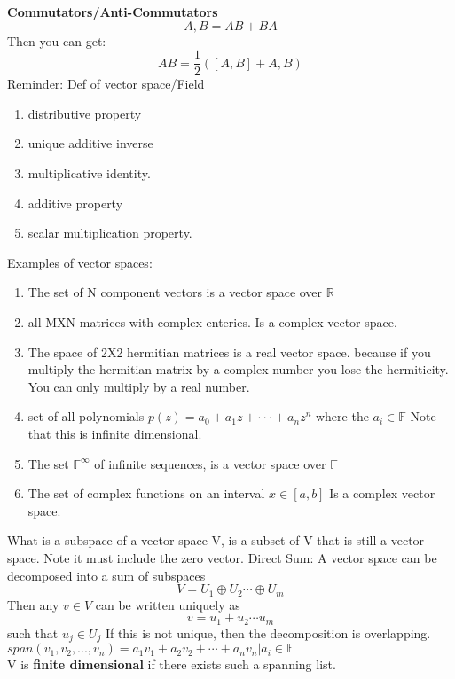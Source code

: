 \documentclass{article}
\begin{document}
{\vspace{5mm}
\textbf{Commutators/Anti-Commutators}
\begin{equation}
{A,B}=AB+BA
\end{equation}
Then you can get:
\begin{equation}
AB=\frac{1}{2}([A,B]+{A,B})
\end{equation}
\vspace{5mm}
Reminder: Def of vector space/Field
\begin{enumerate}
\item distributive property
\item unique additive inverse
\item multiplicative identity. 
\item additive property
\item scalar multiplication property. 
\end{enumerate}
Examples of vector spaces:
\begin{enumerate}
\item The set of N component vectors is a vector space over $\mathbb{R}$
\item all MXN matrices with complex enteries. Is a complex vector space.
\item The space of 2X2 hermitian matrices is a real vector space. because if you multiply the hermitian matrix by a complex number you lose the hermiticity. You can only multiply by a real number.
\item set of all polynomials $p(z)=a_0+a_1z+\cdot \cdot \cdot +a_nz^n$ where the $a_i \in \mathbb{F}$ Note that this is infinite dimensional. 
\item The set $\mathbb{F}^\infty$ of infinite sequences, is a vector space over $\mathbb{F}$
\item The set of complex functions on an interval $ x \in [a,b]$ Is a complex vector space. 
\end{enumerate}
What is a subspace of a vector space V, is a subset of V that is still a vector space. Note it must include the zero vector. 
\vspace{5mm}
Direct Sum: A vector space can be decomposed into a sum of subspaces\\
\begin{equation}
V=U_1\oplus U_2\cdots \oplus U_m
\end{equation}
Then any $v\in V$ can be written uniquely as
\begin{equation}
v=u_1+u_2\cdots u_m
\end{equation}
such that $u_j \in U_j$
If this is not unique, then the decomposition is overlapping. 
\vspace{5mm}
$span(v_1,v_2,...,v_n)={a_1v_1+a_2v_2+\cdots+a_nv_n\vert a_i \in \mathbb{F}}$\\
V is \textbf{finite dimensional} if there exists such a spanning list. 

}
\end{document}
